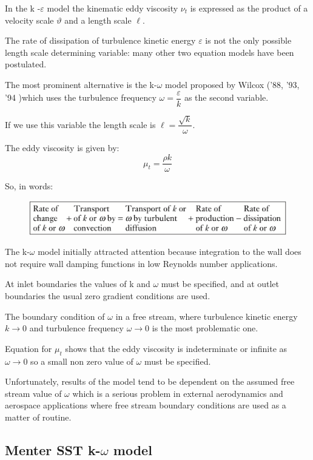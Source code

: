 \documentclass[a4paper, 15pt]{article}
\begin{document}
In
the k -$\varepsilon$ model the kinematic eddy viscosity $\nu_t$ is expressed as the product of a velocity scale $\vartheta$
and a length scale $\ell$.  

The
rate of dissipation of turbulence kinetic energy $\varepsilon$ is not the only possible length scale
determining variable: many other two equation models have been postulated. \newline 

The
most prominent alternative is the k-$\omega$ model proposed by Wilcox ('88, '93, '94 )which
uses the turbulence frequency \(\omega = \dfrac{\varepsilon}{k} \) as the second variable. 

If we use this
variable the length scale is \(\ell = \dfrac{\sqrt{k}}{\omega}\).


The eddy viscosity is given by:
\[\mu_t = \dfrac{\rho k}{\omega}\]

So, in words:
\begin{figure}[H]
	\centering
	\includegraphics[width=0.5\linewidth]{fig/screenshot005}
	\label{fig:screenshot005}
\end{figure}

The
k-$\omega$ model initially attracted attention because integration to the wall does not require wall damping functions in low Reynolds number applications. 

At
inlet boundaries the values of k and $\omega$ must be specified, and at outlet boundaries the usual zero gradient conditions are used.

The
boundary condition of $\omega$ in a free stream, where turbulence kinetic energy $k\rightarrow0$ and
turbulence frequency $\omega\rightarrow0$ is the most problematic one. 

Equation
for $\mu_t$ shows that the eddy viscosity is indeterminate or infinite as $\omega\rightarrow0$ so a small
non zero value of $\omega$ must be specified. 

Unfortunately,
results of the model tend to be dependent on the assumed free stream value of
$\omega$ which is a serious problem in external aerodynamics and aerospace applications where free
stream boundary conditions are used as a matter of routine.

\subsection{Menter SST k-$\omega$ model}
\end{document}
